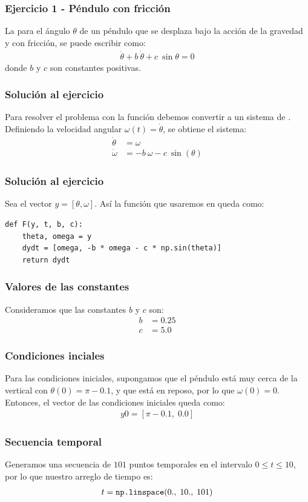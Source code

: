 \documentclass[12pt]{beamer}
\begin{document}
\begin{frame}
\frametitle{Ejercicio 1 - Péndulo con fricción}
La  para el ángulo $\theta$ de un péndulo que se desplaza bajo la acción de la gravedad y con fricción, se puede escribir como:
\pause
\begin{align*}
\ddot{\theta} +  b \: \dot{\theta} +  c \: \sin \theta = 0 
\end{align*}
donde $b$ y $c$ son constantes positivas.
\end{frame}
\begin{frame}
\frametitle{Solución al ejercicio}
Para resolver el problema con la función  debemos convertir a un sistema de .
\\
\bigskip
\pause
Definiendo la velocidad angular $\omega (t) = \dot{\theta}$, se obtiene el sistema:
\pause
\begin{align*}
\dot{\theta} &= \omega \\
\dot{\omega} &= -b \:\omega - c \: \sin(\theta)
\end{align*}
\end{frame}
\begin{frame}[fragile]
\frametitle{Solución al ejercicio}
Sea el vector $y =  [\theta, \omega]$. Así la función que usaremos en \python{} queda como:
\begin{lstlisting}[caption=Función a integrar para el ejecicio del péndulo]
def F(y, t, b, c):
    theta, omega = y
    dydt = [omega, -b * omega - c * np.sin(theta)]
    return dydt
\end{lstlisting}
\end{frame}
\begin{frame}
\frametitle{Valores de las constantes}
Consideramos que las constantes $b$ y $c$ son:
\begin{align*}
b &= 0.25 \\
c &= 5.0
\end{align*} 
\end{frame}
\begin{frame}
\frametitle{Condiciones inciales}
Para las condiciones iniciales, supongamos que el péndulo está muy cerca de la vertical con $\theta(0) = \pi - 0.1$, y que está en reposo, por lo que $\omega(0) = 0$.
\\
\bigskip
\pause
Entonces, el vector de las condiciones iniciales queda como:
\pause
\begin{align*}
y0 =  [\pi - 0.1 , \; 0.0]
\end{align*}
\end{frame}
\begin{frame}
\frametitle{Secuencia temporal}
Generamos una secuencia de $101$ puntos temporales en el intervalo $0 \leq t \leq 10$, por lo que nuestro arreglo de tiempo es:
\pause
\begin{align*}
t =  \mbox{\texttt{np.linspace}}(0., \; 10., \; 101)
\end{align*}
\end{frame}
\end{document}
